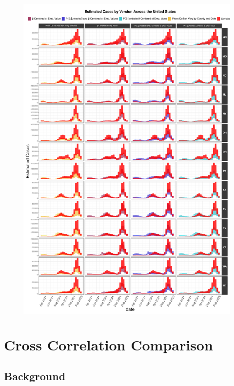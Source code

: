 \documentclass[12pt,twoside]{smiththesis}
\begin{document}
\begin{figure}
\includegraphics[width=1\linewidth]{figure/state_comp_covidestim2} \caption{\label{fig:state-results-2}}\label{fig:unnamed-chunk-79}
\end{figure}
\hypertarget{cross-correlation-comparison}{%
\section{Cross Correlation Comparison}\label{cross-correlation-comparison}}

\hypertarget{background-1}{%
\subsection{Background}\label{background-1}}
\end{document}
